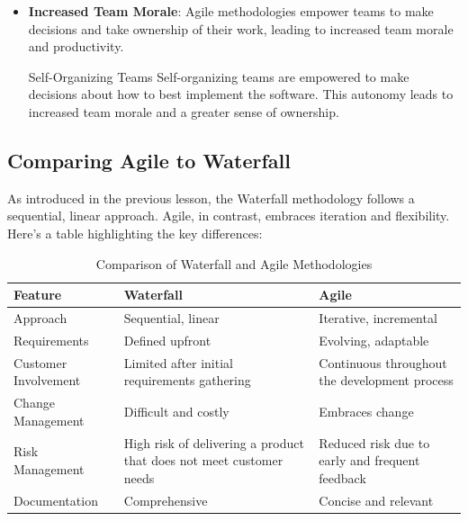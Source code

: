 \begin{itemize}
  \item \textbf{Increased Team Morale}: Agile methodologies empower teams to make decisions and take ownership of their work, leading to increased team morale and productivity.

        \begin{examplecard}{Self-Organizing Teams}
          Self-organizing teams are empowered to make decisions about how to best implement the software. This autonomy leads to increased team morale and a greater sense of ownership.
        \end{examplecard}

\end{itemize}

\subsection{Comparing Agile to Waterfall}

As introduced in the previous lesson, the Waterfall methodology follows a
sequential, linear approach. Agile, in contrast, embraces iteration and
flexibility. Here's a table highlighting the key differences:

\begin{table}[!h]
  \centering
  \begin{tabular}{p{4cm}|p{5cm}|p{5cm}}
    \hline
    \textbf{Feature}     & \textbf{Waterfall}                                                  & \textbf{Agile}                                  \\
    \hline
    Approach             & Sequential, linear                                                  & Iterative, incremental                          \\
    \hline
    Requirements         & Defined upfront                                                     & Evolving, adaptable                             \\
    \hline
    Customer Involvement & Limited after initial requirements gathering                        & Continuous throughout the development process   \\
    \hline
    Change Management    & Difficult and costly                                                & Embraces change                                 \\
    \hline
    Risk Management      & High risk of delivering a product that does not meet customer needs & Reduced risk due to early and frequent feedback \\
    \hline
    Documentation        & Comprehensive                                                       & Concise and relevant                            \\
    \hline
  \end{tabular}
  \caption{Comparison of Waterfall and Agile Methodologies}
  \label{tab:waterfall_vs_agile}
\end{table}

